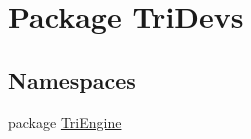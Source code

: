 \hypertarget{namespace_tri_devs}{\section{Package Tri\-Devs}
\label{namespace_tri_devs}
}
\subsection*{Namespaces}
\begin{DoxyCompactItemize}
\item 
package \hyperlink{namespace_tri_devs_1_1_tri_engine}{Tri\-Engine}
\end{DoxyCompactItemize}
